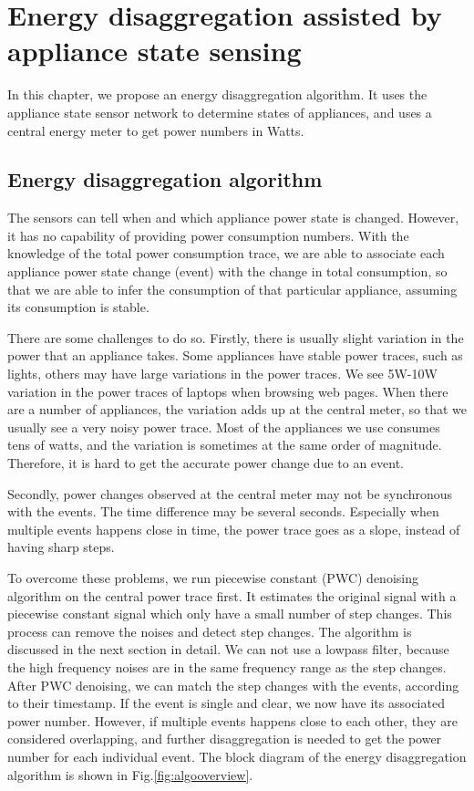 \chapter{Energy disaggregation assisted by appliance state sensing}\label{chap5}

In this chapter, we propose an energy disaggregation algorithm. It uses the appliance state sensor network to determine states of appliances, and uses a central energy meter to get power numbers in Watts. 

\section{Energy disaggregation algorithm}

The sensors can tell when and which appliance power state is changed. However, it has no capability of providing power consumption numbers. With the knowledge of the total power consumption trace, we are able to associate each appliance power state change (event) with the change in total consumption, so that we are able to infer the consumption of that particular appliance, assuming its consumption is stable. 

There are some challenges to do so. Firstly, there is usually slight variation in the power that an appliance takes. Some appliances have stable power traces, such as lights, others may have large variations in the power traces. We see 5W-10W variation in the power traces of laptops when browsing web pages. When there are a number of appliances, the variation adds up at the central meter, so that we usually see a very noisy power trace. Most of the appliances we use consumes tens of watts, and the variation is sometimes at the same order of magnitude. Therefore, it is hard to get the accurate power change due to an event.

Secondly, power changes observed at the central meter may not be synchronous with the events. The time difference may be several seconds. Especially when multiple events happens close in time, the power trace goes as a slope, instead of having sharp steps. 

To overcome these problems, we run piecewise constant (PWC) denoising algorithm on the central power trace first. It estimates the original signal with a piecewise constant signal which only have a small number of step changes. This process can remove the noises and detect step changes. The algorithm is discussed in the next section in detail. We can not use a lowpass filter, because the high frequency noises are in the same frequency range as the step changes. After PWC denoising, we can match the step changes with the events, according to their timestamp. If the event is single and clear, we now have its associated power number. However, if multiple events happens close to each other, they are considered overlapping, and further disaggregation is needed to get the power number for each individual event. The block diagram of the energy disaggregation algorithm is shown in Fig.\ref{fig:algooverview}. 

